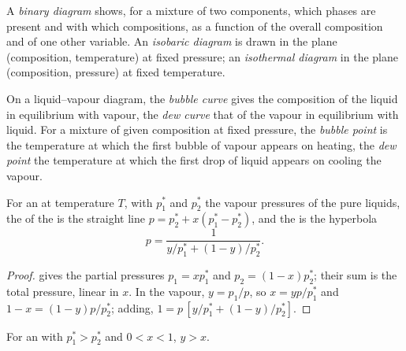 \begin{definition}\label{def:b2:liquid-vapour-diagrams:binary-diagram}
A \emph{binary diagram} shows, for a mixture of two
components, which phases are present and with which compositions, as a
function of the overall composition and of one other variable. An
\emph{isobaric diagram} is drawn in the plane
(composition, temperature) at fixed pressure; an \emph{isothermal
diagram} in the plane (composition, pressure) at
fixed temperature.
\end{definition}

\begin{definition}\label{def:b2:liquid-vapour-diagrams:bubble-dew}
On a liquid--vapour diagram, the \emph{bubble curve} gives
the composition of the liquid in equilibrium with vapour, the \emph{dew
curve} that of the vapour in equilibrium with liquid. For a
mixture of given composition at fixed pressure, the \emph{bubble
point} is the temperature at which the first bubble of
vapour appears on heating, the \emph{dew point} the
temperature at which the first drop of liquid appears on cooling the vapour.
\end{definition}

\begin{proposition}\label{prop:b2:liquid-vapour-diagrams:ideal-curves}
For an  at temperature $T$, with $p_1^*$ and $p_2^*$ the vapour
pressures of the pure liquids, the  of the  is
the straight line $p = p_2^* + x(p_1^* - p_2^*)$, and the  is the
hyperbola
\[
  p = \frac{1}{y/p_1^* + (1 - y)/p_2^*} .
\]
\end{proposition}

\begin{proof}
 gives the partial pressures $p_1 = xp_1^*$ and $p_2 = (1 -
x)p_2^*$; their sum is the total pressure, linear in $x$. In the vapour,
$y = p_1/p$, so $x = yp/p_1^*$ and $1 - x = (1 - y)p/p_2^*$; adding,
$1 = p\,[y/p_1^* + (1 - y)/p_2^*]$.
\end{proof}

\begin{proposition}\label{prop:b2:liquid-vapour-diagrams:richer}
For an  with $p_1^* > p_2^*$ and $0 < x < 1$, $y > x$.
\end{proposition}

